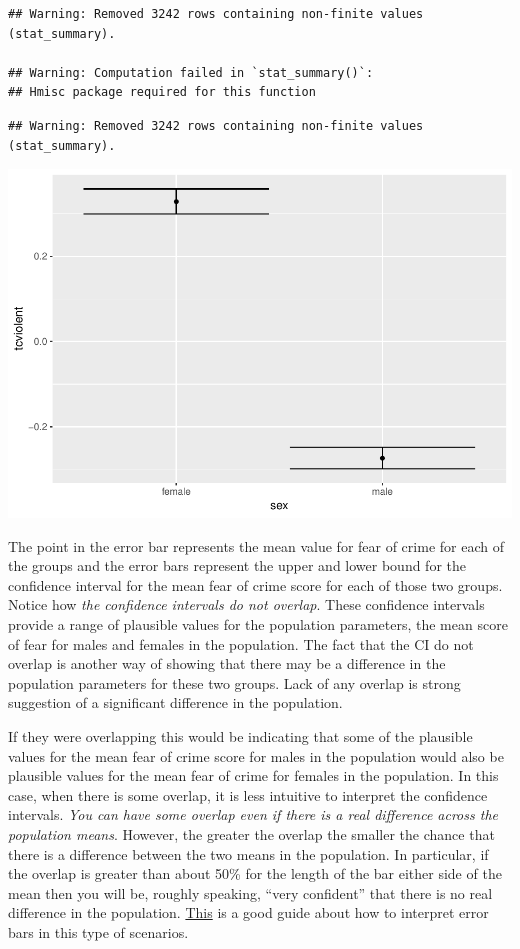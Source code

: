 \documentclass[]{book}
\theoremstyle{definition}
\theoremstyle{definition}
\theoremstyle{definition}
\theoremstyle{remark}
\begin{document}
\begin{verbatim}
## Warning: Removed 3242 rows containing non-finite values (stat_summary).

## Warning: Computation failed in `stat_summary()`:
## Hmisc package required for this function
\end{verbatim}

\begin{verbatim}
## Warning: Removed 3242 rows containing non-finite values (stat_summary).
\end{verbatim}

\includegraphics{05-inference_files/figure-latex/unnamed-chunk-43-3.pdf}

The point in the error bar represents the mean value for fear of crime
for each of the groups and the error bars represent the upper and lower
bound for the confidence interval for the mean fear of crime score for
each of those two groups. Notice how \emph{the confidence intervals do
not overlap}. These confidence intervals provide a range of plausible
values for the population parameters, the mean score of fear for males
and females in the population. The fact that the CI do not overlap is
another way of showing that there may be a difference in the population
parameters for these two groups. Lack of any overlap is strong
suggestion of a significant difference in the population.

If they were overlapping this would be indicating that some of the
plausible values for the mean fear of crime score for males in the
population would also be plausible values for the mean fear of crime for
females in the population. In this case, when there is some overlap, it
is less intuitive to interpret the confidence intervals. \emph{You can
have some overlap even if there is a real difference across the
population means}. However, the greater the overlap the smaller the
chance that there is a difference between the two means in the
population. In particular, if the overlap is greater than about 50\% for
the length of the bar either side of the mean then you will be, roughly
speaking, ``very confident'' that there is no real difference in the
population.
\href{http://www.apastyle.org/manual/related/cumming-and-finch.pdf}{This}
is a good guide about how to interpret error bars in this type of
scenarios.
\end{document}

